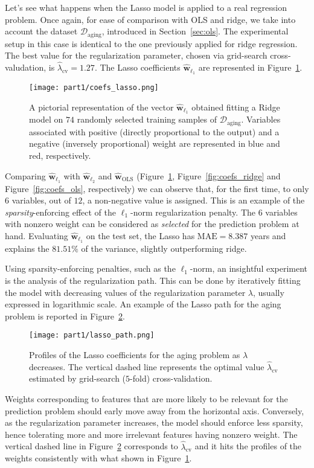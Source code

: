			Let's see what happens when the Lasso model is applied to a real regression problem. Once again, for ease of comparison with OLS and ridge, we take into account the dataset $\mathcal{D}_{\text{aging}}$, introduced in Section~\ref{sec:ols}. The experimental setup in this case is identical to the one previously applied for ridge regression. The best value for the regularization parameter, chosen via grid-search cross-valudation, is $\hat \lambda_{\text{cv}}=1.27$. The Lasso coefficients $\bm{ \hat w}_{\ell_1}$ are represented in Figure~\ref{fig:coefs_lasso}.
			\begin{figure}[!h]
				\centering
				\texttt{[image: part1/coefs\_lasso.png]}
				\caption{A pictorial representation of the vector $\bm{\hat w}_{\ell_1}$ obtained fitting a Ridge model on $74$ randomly selected training samples of $\mathcal{D}_{\text{aging}}$. Variables associated with positive (\ie directly proportional to the output) and a negative (\ie inversely proportional) weight are represented in blue and red, respectively.} \label{fig:coefs_lasso}
			\end{figure}
			Comparing $\bm{\hat w}_{\ell_1}$ with $\bm{\hat w}_{\ell_2}$ and $\bm{\hat w}_{\text{OLS}}$ (Figure~\ref{fig:coefs_lasso}, Figure~\ref{fig:coefs_ridge} and Figure~\ref{fig:coefs_ols}, respectively) we can observe that, for the first time, to only $6$ variables, out of $12$, a non-negative value is assigned. This is an example of the \textit{sparsity}-enforcing effect of the $\ell_1$-norm regularization penalty.
			The $6$ variables with nonzero weight can be considered as \textit{selected} for the prediction problem at hand.
			Evaluating $\bm{\hat w}_{\ell_1}$ on the test set, the Lasso has  $\text{MAE}=8.387$ years and explains the $81.51\%$ of the variance, slightly outperforming ridge.

			Using sparsity-enforcing penalties, such as the $\ell_1$-norm, an insightful experiment is the analysis of the regularization path. This can be done by iteratively fitting the model with decreasing values of the regularization parameter $\lambda$, usually expressed in logarithmic scale. An example of the Lasso path for the aging problem is reported in Figure~\ref{fig:lasso_path}.
			\begin{figure}[!h]
				\centering
				\texttt{[image: part1/lasso\_path.png]}
				\caption{Profiles of the Lasso coefficients for the aging problem as $\lambda$ decreases. The vertical dashed line represents the optimal value $\hat \lambda_{\text{cv}}$ estimated by grid-search ($5$-fold) cross-validation.} \label{fig:lasso_path}
			\end{figure}
			Weights corresponding to features that are more likely to be relevant for the prediction problem should early move away from the horizontal axis. Conversely, as the regularization parameter increases, the model should enforce less sparsity, hence tolerating more and more irrelevant features having nonzero weight. The vertical dashed line in Figure~\ref{fig:lasso_path} corresponds to $\hat \lambda_{\text{cv}}$ and it hits the profiles of the weights consistently with what shown in Figure~\ref{fig:coefs_lasso}.

